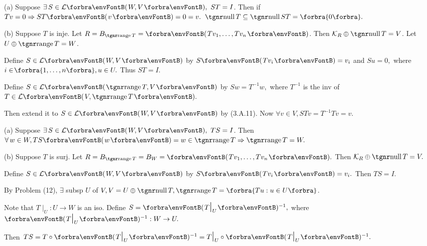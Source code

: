 \documentclass[a4paper, 11pt, UTF8]{article}
\begin{document}
\begin{large}
\par\quad
(a) Suppose $\exists\,S\in\Lm{W,V},\,\,ST=I$. Then if $Tv=0\Rightarrow ST\Par{v}=0=v.$ \Or $\null T\subseteq\null ST=\zeroSubs.$\par\quad
(b) Suppose $T$ is inje. Let $R=B_{\range T}=\Par{Tv_1,\dots,Tv_n}$. Then $\mathcal{K}_R\oplus\null T=V$. Let $U\oplus\range T=W$.\par\quad\Hb
Define $S\in\Lm{W,V}$ by $S\Par{Tv_i}=v_i$ and $Su=0,$ where $i\in\!\Bra{1,\dots,n},u\in U.$ Thus $ST=I.$\par\vspace{6pt}\quad\Hb
\Or Define $S\in\Lm{\range T,V}$ by $Sw=T^{-1}w,$ {\tgsl where $T^{-1}$ is the inv of $T\in\Lm{V,\range T}.$}\par\quad\Hb
Then extend it to $S\in\Lm{W,V}$ by (3.A.11). Now $\forall v\in V,STv=T^{-1}Tv=v.$\PfEnd
\SepLine

\par\quad
(a) Suppose $\exists\,S\in\Lm{W,V},\,\,TS=I$. Then $\forall\,w\in W,TS\Par{w}=w\in\range T\Rightarrow \range T=W.$\par\quad
(b) Suppose $T$ is surj. Let $R=B_{\range T}=B_{W}=\Par{Tv_1,\dots,Tv_n}.$ Then $\mathcal{K}_R\oplus\null T=V.$\par\quad\Hb
Define $S\in\Lm{W,V}$ by $S\Par{Tv_i}=v_i.$ Then $TS=I.$\par\vspace{6pt}\quad\Hb
\Or By Problem (12), $\exists$ subsp $U$ of $V,V=U\oplus\null T,\range T=\Bra{Tu:u\in U}$.\par\quad\Hb
Note that $T\mid_U:U\rightarrow W$ is an iso. Define $S=\Par{T\mid_U}{^{-1}},$ where $\Par{T\mid_U}{^{-1}}:W\rightarrow U.$\par\quad\Hb
Then $TS=T\circ\Par{T\mid_U}{^{-1}}=T\mid_U\circ\Par{T\mid_U}{^{-1}}.$\PfEnd
\SepLine


\end{large}
\end{document}
